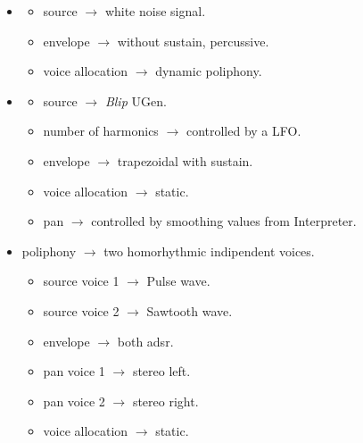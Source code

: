 \begin{itemize}
\tightlist\item 
      \begin{itemize}
      \tightlist\item source \(\rightarrow\) white noise signal.
      \item envelope \(\rightarrow\) without sustain, percussive.
      \item voice allocation \(\rightarrow\)  dynamic poliphony.
      \end{itemize}
\item       
      \begin{itemize}
      \tightlist\item source \(\rightarrow\) \textit{Blip} UGen.
      \item number of harmonics \(\rightarrow\) controlled by a LFO\@.
      \item envelope \(\rightarrow\) trapezoidal with sustain.
      \item voice allocation \(\rightarrow\) static.
      \item pan \(\rightarrow\) controlled by smoothing values from Interpreter.
      \end{itemize}

\item poliphony \(\rightarrow\) two homorhythmic indipendent voices.  
      \begin{itemize}
      \tightlist\item source voice 1 \(\rightarrow\) Pulse wave.
      \item source voice 2 \(\rightarrow\) Sawtooth wave.
      \item envelope \(\rightarrow\) both adsr.
      \item pan voice 1 \(\rightarrow\) stereo left.
      \item pan voice 2 \(\rightarrow\) stereo right.
      \item voice allocation \(\rightarrow\) static.
      \end{itemize}
\end{itemize}